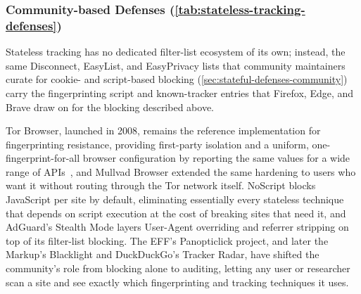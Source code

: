 \subsubsection{Community-based Defenses (\autoref{tab:stateless-tracking-defenses})}
\label{sec:stateless-defenses-community}



%
Stateless tracking has no dedicated filter-list ecosystem of its own; instead, the same Disconnect, EasyList, and EasyPrivacy lists that community maintainers curate for cookie- and script-based blocking (\autoref{sec:stateful-defenses-community}) carry the fingerprinting script and known-tracker entries that Firefox, Edge, and Brave draw on for the blocking described above.


%
Tor Browser, launched in 2008, remains the reference implementation for fingerprinting resistance, providing first-party isolation and a uniform, one-fingerprint-for-all browser configuration by reporting the same values for a wide range of APIs~\cite{perryDesignImplementationTor2013}, and Mullvad Browser extended the same hardening to users who want it without routing through the Tor network itself.
%
NoScript blocks JavaScript per site by default, eliminating essentially every stateless technique that depends on script execution at the cost of breaking sites that need it, and AdGuard's Stealth Mode layers User-Agent overriding and referrer stripping on top of its filter-list blocking.
%
The EFF's Panopticlick project, and later the Markup's Blacklight and DuckDuckGo's Tracker Radar, have shifted the community's role from blocking alone to auditing, letting any user or researcher scan a site and see exactly which fingerprinting and tracking techniques it uses.






